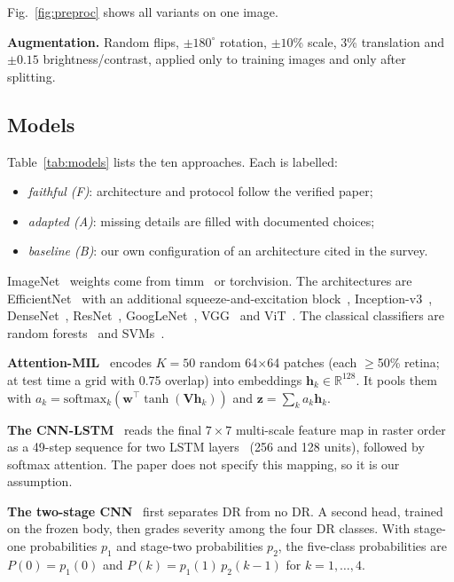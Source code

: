 \documentclass[journal]{IEEEtran}
\begin{document}
Fig.~\ref{fig:preproc} shows all variants on one image.

\textbf{Augmentation.} Random flips, $\pm180^\circ$ rotation, $\pm10$\% scale, 3\% translation and
$\pm0.15$ brightness/contrast, applied only to training images and only after splitting.

\subsection{Models}
Table~\ref{tab:models} lists the ten approaches. Each is labelled:
\begin{itemize}
\item \emph{faithful (F)}: architecture and protocol follow the verified paper;
\item \emph{adapted (A)}: missing details are filled with documented choices;
\item \emph{baseline (B)}: our own configuration of an architecture cited in the survey.
\end{itemize}
ImageNet~\cite{russakovsky2015imagenet} weights come from timm~\cite{wightman2019timm} or
torchvision. The architectures are EfficientNet~\cite{tan2019efficientnet} with an additional
squeeze-and-excitation block~\cite{hu2018se}, Inception-v3~\cite{szegedy2016inception},
DenseNet~\cite{huang2017densenet}, ResNet~\cite{he2016resnet}, GoogLeNet~\cite{szegedy2015googlenet},
VGG~\cite{simonyan2015vgg} and ViT~\cite{dosovitskiy2021vit}. The classical classifiers are random
forests~\cite{breiman2001rf} and SVMs~\cite{cortes1995svm}.

\textbf{Attention-MIL}~\cite{ilse2018attention,papadopoulos2021mil} encodes $K=50$ random
64$\times$64 patches (each $\geq$50\% retina; at test time a grid with 0.75 overlap) into embeddings
$\mathbf{h}_k \in \mathbb{R}^{128}$. It pools them with
$a_k=\mathrm{softmax}_k(\mathbf{w}^\top\tanh(\mathbf{V}\mathbf{h}_k))$ and
$\mathbf{z}=\sum_k a_k\mathbf{h}_k$.

\textbf{The CNN-LSTM}~\cite{sushith2025hybrid} reads the final $7\times7$ multi-scale feature map in
raster order as a 49-step sequence for two LSTM layers~\cite{hochreiter1997lstm} (256 and 128 units),
followed by softmax attention. The paper does not specify this mapping, so it is our assumption.

\textbf{The two-stage CNN}~\cite{zafar2025lightweight} first separates DR from no DR. A second head,
trained on the frozen body, then grades severity among the four DR classes. With stage-one
probabilities $p_1$ and stage-two probabilities $p_2$, the five-class probabilities are
$P(0)=p_1(0)$ and $P(k)=p_1(1)\,p_2(k-1)$ for $k=1,\dots,4$.
\end{document}

